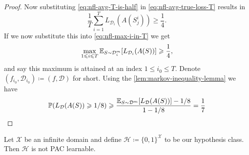 \begin{proof}
Now substituting \cref{eq:nfl-avg-T-is-half} in \cref{eq:nfl-avg-true-loss-T}
results in
\[
\frac{1}{T} \sum_{i=1}^{T} L_{\mathcal{D}_i}(A(S_j^i)) \geq \frac{1}{4}.
\]
If we now substitute this into \cref{eq:nfl-max-i-in-T} we get
\[
\max_{1 \leqslant i \leqslant T} \operatorname{\mathbb{E}}_{S \sim \mathcal{D}_i^m}[L_{\mathcal{D}_i}(A(S))]
\geqslant \frac{1}{4},
\]
and say this maximum is attained at an index \(1 \leq i_0 \leq T\). Denote
\((f_{i_0}, \mathcal{D}_{i_0}) \coloneq (f, \mathcal{D})\) for short. Using the
\cref{lem:markov-inequality-lemma} we have
\[
\operatorname{\mathbb{P}}(L_{\mathcal{D}}(A(S)) \geqslant 1/8)
\geqslant \frac{\operatorname{\mathbb{E}}_{S \sim \mathcal{D}^m}[L_{\mathcal{D}}(A(S))] -
  1/8}{1 - 1/8}
= \frac{1}{7}
\]
\end{proof}

\begin{corollary}
\label{cor:full-hypothesis-class-not-pac-learnable}
Let \(\mathcal{X}\) be an infinite domain and define
\(\mathcal{H} \coloneq \{0, 1\}^{\mathcal{X}}\) to be our hypothesis class. Then
\(\mathcal{H}\) is not PAC learnable.
\end{corollary}



